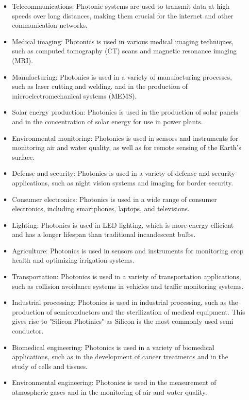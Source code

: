 \documentclass[a4paper]{article}
\begin{document}
    \begin{itemize}
        \item Telecommunications: Photonic systems are used to transmit data at high speeds over long distances, making them crucial for the internet and other communication networks.
        \item Medical imaging: Photonics is used in various medical imaging techniques, such as computed tomography (CT) scans and magnetic resonance imaging (MRI).
        \item Manufacturing: Photonics is used in a variety of manufacturing processes, such as laser cutting and welding, and in the production of microelectromechanical systems (MEMS).
        \item Solar energy production: Photonics is used in the production of solar panels and in the concentration of solar energy for use in power plants.
        \item Environmental monitoring: Photonics is used in sensors and instruments for monitoring air and water quality, as well as for remote sensing of the Earth's surface.
        \item Defense and security: Photonics is used in a variety of defense and security applications, such as night vision systems and imaging for border security.
        \item Consumer electronics: Photonics is used in a wide range of consumer electronics, including smartphones, laptops, and televisions.
        \item Lighting: Photonics is used in LED lighting, which is more energy-efficient and has a longer lifespan than traditional incandescent bulbs.
        \item Agriculture: Photonics is used in sensors and instruments for monitoring crop health and optimizing irrigation systems.
        \item Transportation: Photonics is used in a variety of transportation applications, such as collision avoidance systems in vehicles and traffic monitoring systems.
        \item Industrial processing: Photonics is used in industrial processing, such as the production of semiconductors and the sterilization of medical equipment. This gives rise to "Silicon Photinics" as Silicon is the most commonly used semi conductor.
        \item Biomedical engineering: Photonics is used in a variety of biomedical applications, such as in the development of cancer treatments and in the study of cells and tissues.
        \item Environmental engineering: Photonics is used in the measurement of atmospheric gases and in the monitoring of air and water quality.
    \end{itemize}
\end{document}
